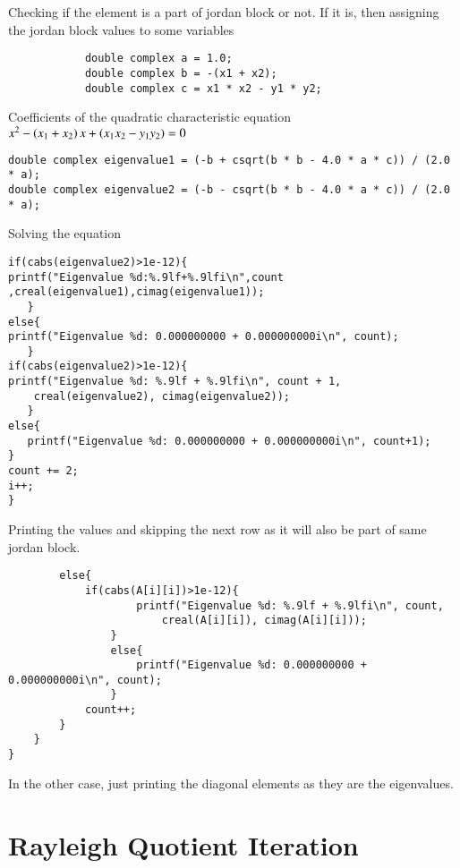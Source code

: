 \documentclass[a4paper,12pt]{article}
\theoremstyle{remark}
\begin{document}
Checking if the element is a part of jordan block or not. If it is, then assigning the jordan block values to some variables
\begin{verbatim}
            double complex a = 1.0;
            double complex b = -(x1 + x2);
            double complex c = x1 * x2 - y1 * y2;
\end{verbatim}
Coefficients of the quadratic characteristic equation $x^2 - \left(x_1+x_2\right)x + \left(x_1x_2-y_1y_2\right) = 0$
\begin{verbatim}
double complex eigenvalue1 = (-b + csqrt(b * b - 4.0 * a * c)) / (2.0 * a);
double complex eigenvalue2 = (-b - csqrt(b * b - 4.0 * a * c)) / (2.0 * a);
\end{verbatim}
Solving the equation
\begin{verbatim}
if(cabs(eigenvalue2)>1e-12){
printf("Eigenvalue %d:%.9lf+%.9lfi\n",count
,creal(eigenvalue1),cimag(eigenvalue1));
   }
else{
printf("Eigenvalue %d: 0.000000000 + 0.000000000i\n", count);
   }      
if(cabs(eigenvalue2)>1e-12){
printf("Eigenvalue %d: %.9lf + %.9lfi\n", count + 1,
	creal(eigenvalue2), cimag(eigenvalue2));
   }
else{
   printf("Eigenvalue %d: 0.000000000 + 0.000000000i\n", count+1);
}
count += 2;
i++;
}
\end{verbatim}
Printing the values and skipping the next row as it will also be part of same jordan block.
\begin{verbatim}
        else{
        	if(cabs(A[i][i])>1e-12){
            		printf("Eigenvalue %d: %.9lf + %.9lfi\n", count,
            			creal(A[i][i]), cimag(A[i][i]));
            	}
            	else{
            		printf("Eigenvalue %d: 0.000000000 + 0.000000000i\n", count);
            	}
            count++;
        }
    }
}

\end{verbatim}
In the other case, just printing the diagonal elements as they are the eigenvalues.
\section{Rayleigh Quotient Iteration}
\end{document}

